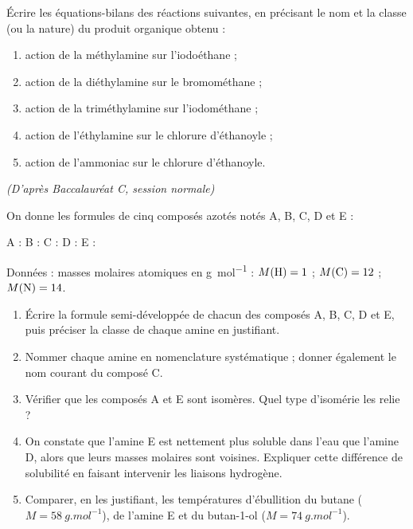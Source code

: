 \documentclass[11pt]{article}
\newcounter{popsec}
\newcounter{popsub}
\newcommand{\courssub}[1]{%
  \stepcounter{popsub}%
  \par\vspace{9pt}\noindent{\popxbold\fontsize{11.5}{13}\selectfont\color{popink}{\color{poporange}\thepopsec.\thepopsub}\hspace{6pt}#1}\par\nopagebreak\vspace{4pt}
}
\begin{document}
\begin{exercice}
Écrire les équations-bilans des réactions suivantes, en précisant le nom et la classe (ou la nature) du produit organique obtenu :
\begin{enumerate}
\item action de la méthylamine  sur l'iodoéthane  ;
\item action de la diéthylamine  sur le bromométhane  ;
\item action de la triméthylamine  sur l'iodométhane ;
\item action de l'éthylamine  sur le chlorure d'éthanoyle  ;
\item action de l'ammoniac sur le chlorure d'éthanoyle.
\end{enumerate}
\end{exercice}

\courssub{Je me prépare au Bac}

\begin{exercice}
\emph{(D'après Baccalauréat C, session normale)}

On donne les formules de cinq composés azotés notés A, B, C, D et E :
\begin{center}
A :  \qquad B :  \qquad C :  \qquad D :  \qquad E : 
\end{center}
Données : masses molaires atomiques en \si{g.mol^{-1}} : $M(\ce{H})=1$ ; $M(\ce{C})=12$ ; $M(\ce{N})=14$.
\begin{enumerate}
\item Écrire la formule semi-développée de chacun des composés A, B, C, D et E, puis préciser la classe de chaque amine en justifiant.
\item Nommer chaque amine en nomenclature systématique ; donner également le nom courant du composé C.
\item Vérifier que les composés A et E sont isomères. Quel type d'isomérie les relie ?
\item On constate que l'amine E est nettement plus soluble dans l'eau que l'amine D, alors que leurs masses molaires sont voisines. Expliquer cette différence de solubilité en faisant intervenir les liaisons hydrogène.
\item Comparer, en les justifiant, les températures d'ébullition du butane ($M = \SI{58}{g.mol^{-1}}$), de l'amine E et du butan-1-ol ($M = \SI{74}{g.mol^{-1}}$).
\end{enumerate}
\end{exercice}
\end{document}
